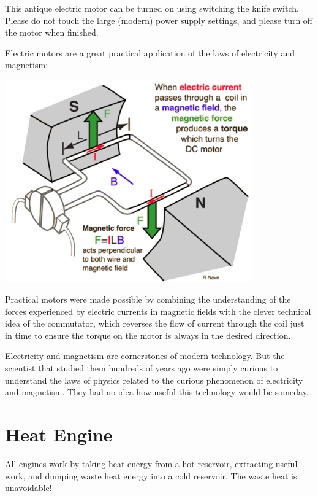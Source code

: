 \documentclass[12pt]{article}
\begin{document}
This antique electric motor can be turned on using switching the knife switch.  Please do not touch the large (modern) power supply settings, and please turn off the motor when finished. \\ \vskip 0.5cm

\noindent
Electric motors are a great practical application of the laws of electricity and magnetism:
\begin{center}
{\includegraphics[width=0.80\textwidth]{figs/dcmfor.pdf}}
\end{center}
Practical motors were made possible by combining the understanding of the forces experienced by electric currents in magnetic fields with the clever technical idea of the commutator, which reverses the flow of current through the coil just in time to ensure the torque on the motor is always in the desired direction. \\ \vskip 0.5cm

\noindent
Electricity and magnetism are cornerstones of modern technology.  But the scientist that studied them hundreds of years ago were simply curious to understand the laws of physics related to the curious phenomenon of electricity and magnetism.  They had no idea how useful this technology would be someday.

\newpage


\section{Heat Engine}

All engines work by taking heat energy from a hot reservoir, extracting useful work, and dumping waste heat energy into a cold reservoir.  The waste heat is unavoidable! \\
\end{document}
